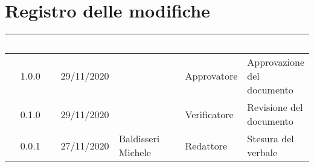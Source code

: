 \section*{Registro delle modifiche}
{
\renewcommand{\arraystretch}{1.5}
\centering
\begin{longtable}{c C{2.6cm}  C{2.6cm} C{2.6cm} C{3.5cm}}
\textcolor{white}{\textbf{Versione}}&
\textcolor{white}{\textbf{Data}}&
\textcolor{white}{\textbf{Nominativo}}&
\textcolor{white}{\textbf{Ruolo}}&
\textcolor{white}{\textbf{Descrizione}}\\	
\endhead
		
1.0.0 & 29/11/2020 & \SG{} & Approvatore & Approvazione del documento\\

0.1.0 & 29/11/2020 & \PA{} & Verificatore & Revisione del documento\\

0.0.1 & 27/11/2020 & Baldisseri Michele & Redattore & Stesura del verbale\\
		
\end{longtable}
}
